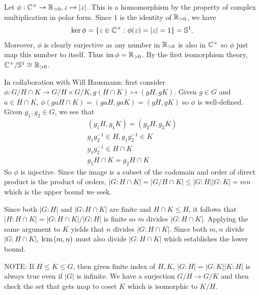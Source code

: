 \documentclass[12pt]{article}
\begin{document}
\begin{problem}[7]
Let $ \phi: \mathbb{C}^{\times } \to \mathbb{R}_{>0}, z \mapsto |z|$. This is a homomorphism by the property of complex multiplication in polar form. Since $ 1$ is the identity of  $ \mathbb{R}_{>0}$, we have
\begin{align*}
	\ker \phi = \{z \in \mathbb{C}^{\times }: \phi(z)=|z|=1\} = \mathbb{S}^{1}.
\end{align*}
Moreover, $ \phi$ is clearly surjective as any number in $ \mathbb{R}_{>0}$ is also in $ \mathbb{C}^{ \times }$ so $ \phi$ just map this number to itself. Thus $ \operatorname{im} \phi = \mathbb{R}_{>0}$. By the first isomorphism theory, $ \mathbb{C}^{\times } / \mathbb{S}^{1} \cong \mathbb{R}_{>0}$.
\end{problem}

\begin{problem}[8]
In collaboration with Will Hausmann: first consider $ \phi: G / H \cap K \to G / H \times G / K, g (H \cap K) \mapsto (gH,gK)$. Given $ g \in G$ and $ a \in H \cap K$, $ \phi(gaH \cap K) = (gaH,gaK) = (gH,gK)$ so $ \phi$ is well-defined. Given $ g_1 , g_2 \in G$, we see that
\begin{align*}
	(g_1 H, g_1 K) = (g_2 H, g_2 K) \\
	g_1 g_2^{-1} \in H, g_1 g_2^{-1} \in K \\
	g_1 g_2^{-1} \in H \cap K  \\
	g_1 H \cap K = g_2 H \cap K
\end{align*}
So $ \phi$ is injective. Since the image is a subset of the codomain and order of direct product is the product of orders, $ |G:H \cap K| = |G /H \cap K| \leq |G:H||G:K| = mn$ which is the upper bound we seek.

Since both $ |G: H|$ and $ |G: H \cap K|$ are finite and $ H \cap K \leq H$, it follows that $ |H: H \cap K| = |G: H \cap K| / |G:H| $ is finite so $ m $ divides $|G: H \cap K|$. Applying the same argument to $ K$ yields that $ n$ divides $|G: H \cap K|$. Since both $ m,n$ divide $ |G: H \cap K|$, $ \operatorname{lcm} \left( m,n \right) $ must also divide $ |G:H \cap K|$ which establishes the lower bound.

NOTE:
If $ H \leq K \leq G$, then given finite index of $ H,K$, $ |G:H| = |G:K||K:H|$ is always true even if $ |G|$ is infinite. We have a surjection $ G /H \to G /K$ and then check the set that gets map to coset $ K$ which is isomorphic to $ K /H$.
\end{problem}
\end{document}
